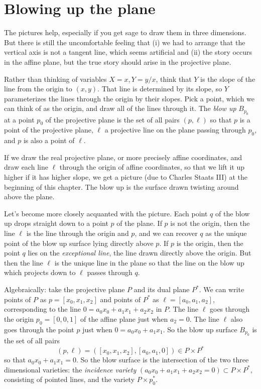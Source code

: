 \section{Blowing up the plane}
The pictures help, especially if you get sage to draw them in three dimensions.
But there is still the uncomfortable feeling that (i) we had to arrange that the vertical axis is not a tangent line, which seems artificial and (ii) the story occurs in the affine plane, but the true story should arise in the projective plane.

Rather than thinking of variables \(X=x,Y=y/x\), think that \(Y\) is the slope of the line from the origin to \((x,y)\).
That line is determined by its slope, so \(Y\) parameterizes the lines through the origin by their slopes.
Pick a point, which we can think of as the origin, and draw all of the lines through it.
The \emph{blow up} \(B_{p_0}\) at a point \(p_0\) of the projective plane is the set of all pairs \((p,\ell)\) so that \(p\) is a point of the projective plane, \(\ell\) a projective line on the plane passing through \(p_0\), and \(p\) is also a point of \(\ell\).

If we draw the real projective plane, or more precisely affine coordinates, and draw each line \(\ell\) through the origin of affine coordinates, so that we lift it up higher if it has higher slope, we get a picture (due to Charles Staats III) at the beginning of this chapter.
The blow up is the surface drawn twisting around above the plane.

Let's become more closely acquanted with the picture.
Each point \(q\) of the blow up drops straight down to a point \(p\) of the plane.
If \(p\) is not the origin, then the line \(\ell\) is the line through the origin and \(p\), and we can recover \(q\) as the unique point of the blow up surface lying directly above \(p\).
If \(p\) is the origin, then the point \(q\) lies on the \emph{exceptional line}, the line drawn directly above the origin.
But then the line \(\ell\) is the unique line in the plane so that the line on the blow up which projects down to \(\ell\) passes through \(q\).

Algebraically: take the projective plane \(P\) and its dual plane \(P^*\).
We can write points of \(P\) as \(p=[x_0,x_1,x_2]\) and points of \(P^*\) as 
\(\ell=[a_0,a_1,a_2]\), corresponding to the line \(0=a_0x_0+a_1x_1+a_2x_2\) in \(P\).
The line \(\ell\) goes through the origin \(p_0=[0,0,1]\) of the affine plane just when \(a_2=0\).
The line \(\ell\) also goes through the point \(p\) just when \(0=a_0x_0+a_1x_1\).
So the blow up surface \(B_{p_0}\) is the set of all pairs 
\[
(p,\ell)=([x_0,x_1,x_2],[a_0,a_1,0])\in P \times P^*
\] 
so that \(a_0x_0+a_1x_1=0\).
So the blow surface is the intersection of the two three dimensional varieties: the \emph{incidence variety} \((a_0x_0+a_1x_1+a_2x_2=0)\subset P \times P^*\), consisting of pointed lines, and the variety \(P\times p_0^*\).

